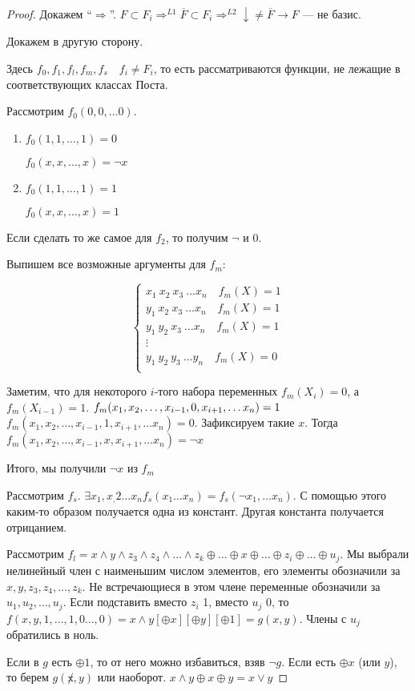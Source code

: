 \begin{proof}
Докажем ``$\Rightarrow$''. $F\subset F_i \Rightarrow^{L1} \overline{F}\subset F_i\Rightarrow^{L2}
\downarrow\not =\overline{F} \rightarrow F$ --- не базис.

Докажем в другую сторону.

Здесь $f_0, f_1, f_l, f_m, f_s \quad f_i\not =F_i$, то есть рассматриваются функции,
не лежащие в соответствующих классах Поста.

Рассмотрим $f_0(0,0,\ldots 0)$.
\begin{enumerate}
\item $f_0(1,1,\ldots,1)=0$

$f_0(x,x,\ldots,x)=\neg x$
\item $f_0(1,1,\ldots,1)=1$


$f_0(x,x,\ldots,x)=1$
\end{enumerate}

Если сделать то же самое для $f_2$, то получим $\neg$ и $0$.

Выпишем все возможные аргументы для $f_m$:

$$
\begin{cases}
    x_1\ x_2\ x_3\ \ldots x_n \quad f_m(X)=1 \\
    y_1\ x_2\ x_3\ \ldots x_n \quad f_m(X)=1 \\
    y_1\ y_2\ x_3\ \ldots x_n \quad f_m(X)=1 \\
    \vdots \\
    y_1\ y_2\ y_3\ \ldots y_n \quad f_m(X)=0 \\
\end{cases}
$$

Заметим, что для некоторого $i$-того набора переменных $f_m(X_i)=0$, а $f_m(X_{i-1})=1$.
$f_m(x_1,x_2,\ldots,x_{i-1},0,x_{i+1}, \ldots x_n)=1 \\$
$f_m(x_1,x_2,\ldots,x_{i-1},1,x_{i+1}, \ldots x_n)=0$. Зафиксируем такие $x$. Тогда
$f_m(x_1,x_2,\ldots,x_{i-1},x,x_{i+1}, \ldots x_n)=\neg x$

Итого, мы получили $\neg x$ из $f_m$

Рассмотрим $f_s$. $\exists x_1,x_,2\ldots x_n f_s(x_1\ldots x_n)=f_s(\neg x_1, \ldots x_n)$.
С помощью этого каким-то образом получается одна из констант. Другая константа получается отрицанием.

Рассмотрим $f_l=x\wedge y\wedge z_3\wedge z_4\wedge \ldots \wedge z_k \oplus\ldots\oplus
x\oplus\ldots\oplus z_i\oplus\ldots\oplus u_j$. Мы выбрали нелинейный член с наименьшим
числом элементов, его элементы обозначили за $x,y,z_3,z_4,\ldots,z_k$. Не встречающиеся
в этом члене переменные обозначили за $u_1,u_2,\ldots,u_j$. Если подставить вместо $z_i$ 1,
вместо $u_j$ 0, то $f(x,y,1,\ldots,1,0\ldots,0)=x\wedge y [\oplus x][\oplus y][\oplus 1]=g(x,y)$.
Члены с $u_j$ обратились в ноль.

Если в $g$ есть $\oplus 1$, то от него можно избавиться, взяв $\neg g$. Если есть 
$\oplus x$ (или $y$), то берем $g(\not x, y)$ или наоборот. $x\wedge y\oplus x\oplus y=x\vee y$

\end{proof}

